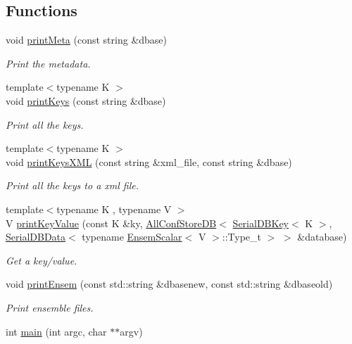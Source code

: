 \subsection*{Functions}
\begin{DoxyCompactItemize}
\item 
void \mbox{\hyperlink{adat-devel_2main_2dbutil_2dbgraph__convert_8cc_a0577d572da492642f9cf5f404d0116d9}{print\+Meta}} (const string \&dbase)
\begin{DoxyCompactList}\small\item\em Print the metadata. \end{DoxyCompactList}\item 
{\footnotesize template$<$typename K $>$ }\\void \mbox{\hyperlink{adat-devel_2main_2dbutil_2dbgraph__convert_8cc_a05c6483ffb9fa71112b451a5dd7eb935}{print\+Keys}} (const string \&dbase)
\begin{DoxyCompactList}\small\item\em Print all the keys. \end{DoxyCompactList}\item 
{\footnotesize template$<$typename K $>$ }\\void \mbox{\hyperlink{adat-devel_2main_2dbutil_2dbgraph__convert_8cc_a44428d59560cb466420c5c0ca60315e5}{print\+Keys\+X\+ML}} (const string \&xml\+\_\+file, const string \&dbase)
\begin{DoxyCompactList}\small\item\em Print all the keys to a xml file. \end{DoxyCompactList}\item 
{\footnotesize template$<$typename K , typename V $>$ }\\V \mbox{\hyperlink{adat-devel_2main_2dbutil_2dbgraph__convert_8cc_a1c5a310406bc62a92190de39689f1005}{print\+Key\+Value}} (const K \&ky, \mbox{\hyperlink{classFILEDB_1_1AllConfStoreDB}{All\+Conf\+Store\+DB}}$<$ \mbox{\hyperlink{classADATIO_1_1SerialDBKey}{Serial\+D\+B\+Key}}$<$ K $>$, \mbox{\hyperlink{classADATIO_1_1SerialDBData}{Serial\+D\+B\+Data}}$<$ typename \mbox{\hyperlink{structENSEM_1_1EnsemScalar}{Ensem\+Scalar}}$<$ V $>$\+::Type\+\_\+t $>$ $>$ \&database)
\begin{DoxyCompactList}\small\item\em Get a key/value. \end{DoxyCompactList}\item 
void \mbox{\hyperlink{adat-devel_2main_2dbutil_2dbgraph__convert_8cc_a6fc5db26f2d2594d2601479adfa9dc32}{print\+Ensem}} (const std\+::string \&dbasenew, const std\+::string \&dbaseold)
\begin{DoxyCompactList}\small\item\em Print ensemble files. \end{DoxyCompactList}\item 
int \mbox{\hyperlink{adat-devel_2main_2dbutil_2dbgraph__convert_8cc_a3c04138a5bfe5d72780bb7e82a18e627}{main}} (int argc, char $\ast$$\ast$argv)
\end{DoxyCompactItemize}


